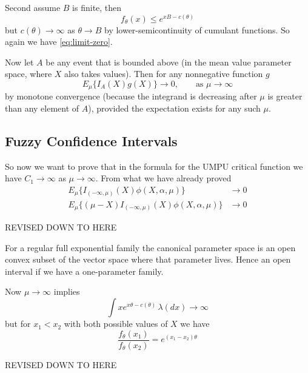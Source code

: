 \documentclass[11pt]{article}
\begin{document}
Second assume $B$ is finite, then
$$
   f_\theta(x) \le e^{x B - c(\theta)}
$$
but $c(\theta) \to \infty$ as $\theta \to B$ by lower-semicontinuity
of cumulant functions.  So again we have \eqref{eq:limit-zero}.

Now let $A$ be any event that is bounded above (in the mean value parameter
space, where $X$ also takes values).  Then for any nonnegative function $g$
$$
    E_\mu \{ I_A(X) g(X) \} \to 0, \qquad \text{as $\mu \to \infty$}
$$
by monotone convergence (because the integrand is decreasing after $\mu$
is greater than any element of $A$), provided the expectation exists for
any such $\mu$.

\subsection{Fuzzy Confidence Intervals}

So now we want to prove that in the formula for the UMPU critical function
we have $C_1 \to \infty$ as $\mu \to \infty$.
From what we have already proved
\begin{align*}
   E_\mu\{ I_{(- \infty, \mu)}(X) \phi(X, \alpha, \mu) \} & \to 0
   \\
   E_\mu\{ (\mu - X) I_{(- \infty, \mu)}(X) \phi(X, \alpha, \mu) \} & \to 0
\end{align*}

\begin{center} \LARGE REVISED DOWN TO HERE \end{center}

For a regular full exponential family the canonical parameter space
is an open convex subset of the vector space where that parameter lives.
Hence an open interval if we have a one-parameter family.

Now $\mu \to \infty$ implies
$$
   \int x e^{x \theta - c(\theta)} \, \lambda(d x) \to \infty
$$
but for $x_1 < x_2$ with both possible values of $X$ we have
$$
   \frac{f_\theta(x_1)}{f_\theta(x_2)} = e^{(x_1 - x_2) \theta}
$$

\begin{center} \LARGE REVISED DOWN TO HERE \end{center}
\end{document}
